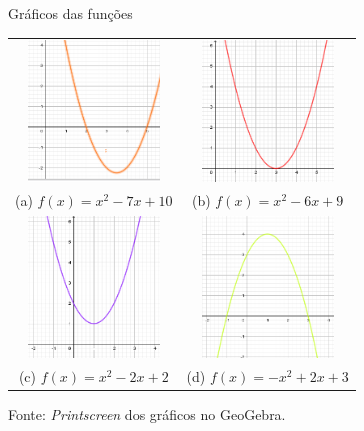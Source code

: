 \begin{refsection}
    \begin{figure}
        \centering%
        \caption{Gráficos das funções}%
        \begin{tabular}{cc}%
            \includegraphics[width=35mm]{articles/03-contribuicoes-do-sof/image4.png}%
            & \includegraphics[width=35mm]{articles/03-contribuicoes-do-sof/image5.png}\\%
            (a) $f(x) = x^2 - 7x + 10$ & (b) $f(x) = x^2 - 6x +  9$ \\[2ex]%
            \includegraphics[width=35mm]{articles/03-contribuicoes-do-sof/image6.png}%
            & \includegraphics[width=35mm]{articles/03-contribuicoes-do-sof/image7.png}\\%
            (c) $f(x) = x^2 - 2x + 2$ & (d) $f(x) = -x^2 + 2x +  3$ \\%
        \end{tabular}%
        \caption*{Fonte: \textit{Printscreen} dos gráficos no GeoGebra.}%
        \label{fig:graficos-geogebra}%
    \end{figure}


\end{refsection}
